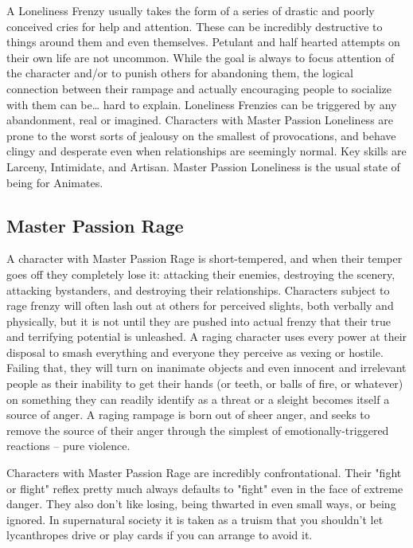 A Loneliness Frenzy usually takes the form of a series of drastic and poorly conceived cries for help and attention. These can be incredibly destructive to things around them and even themselves. Petulant and half hearted attempts on their own life are not uncommon. While the goal is always to focus attention of the character and/or to punish others for abandoning them, the logical connection between their rampage and actually encouraging people to socialize with them can be\ldots{} hard to explain. Loneliness Frenzies can be triggered by any abandonment, real or imagined. Characters with Master Passion Loneliness are prone to the worst sorts of jealousy on the smallest of provocations, and behave clingy and desperate even when relationships are seemingly normal. Key skills are Larceny, Intimidate, and Artisan. Master Passion Loneliness is the usual state of being for Animates.

\subsection{Master Passion Rage}

A character with Master Passion Rage is short-tempered, and when their temper goes off they completely lose it: attacking their enemies, destroying the scenery, attacking bystanders, and destroying their relationships.  Characters subject to rage frenzy will often lash out at others for perceived slights, both verbally and physically, but it is not until they are pushed into actual frenzy that their true and terrifying potential is unleashed. A raging character uses every power at their disposal to smash everything and everyone they perceive as vexing or hostile. Failing that, they will turn on inanimate objects and even innocent and irrelevant people as their inability to get their hands (or teeth, or balls of fire, or whatever) on something they can readily identify as a threat or a sleight becomes itself a source of anger. A raging rampage is born out of sheer anger, and seeks to remove the source of their anger through the simplest of emotionally-triggered reactions -- pure violence.

Characters with Master Passion Rage are incredibly confrontational. Their "fight or flight" reflex pretty much always defaults to "fight" even in the face of extreme danger. They also don't like losing, being thwarted in even small ways, or being ignored. In supernatural society it is taken as a truism that you shouldn't let lycanthropes drive or play cards if you can arrange to avoid it.

